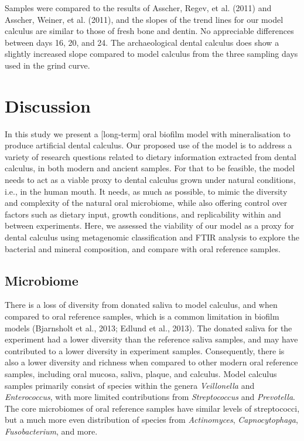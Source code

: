 \documentclass[
]{article}
\begin{document}
Samples were compared to the results of Asscher, Regev, et al. (2011)
and Asscher, Weiner, et al. (2011), and the slopes of the trend lines
for our model calculus are similar to those of fresh bone and dentin. No
appreciable differences between days 16, 20, and 24. The archaeological
dental calculus does show a slightly increased slope compared to model
calculus from the three sampling days used in the grind curve.

\hypertarget{discussion}{%
\section{Discussion}\label{discussion}}

In this study we present a {[}long-term{]} oral biofilm model with
mineralisation to produce artificial dental calculus. Our proposed use
of the model is to address a variety of research questions related to
dietary information extracted from dental calculus, in both modern and
ancient samples. For that to be feasible, the model needs to act as a
viable proxy to dental calculus grown under natural conditions, i.e., in
the human mouth. It needs, as much as possible, to mimic the diversity
and complexity of the natural oral microbiome, while also offering
control over factors such as dietary input, growth conditions, and
replicability within and between experiments. Here, we assessed the
viability of our model as a proxy for dental calculus using metagenomic
classification and FTIR analysis to explore the bacterial and mineral
composition, and compare with oral reference samples.

\hypertarget{microbiome}{%
\subsection{Microbiome}\label{microbiome}}

There is a loss of diversity from donated saliva to model calculus, and
when compared to oral reference samples, which is a common limitation in
biofilm models (Bjarnsholt et al., 2013; Edlund et al., 2013). The
donated saliva for the experiment had a lower diversity than the
reference saliva samples, and may have contributed to a lower diversity
in experiment samples. Consequently, there is also a lower diversity and
richness when compared to other modern oral reference samples, including
oral mucosa, saliva, plaque, and calculus. Model calculus samples
primarily consist of species within the genera \emph{Veillonella} and
\emph{Enterococcus}, with more limited contributions from
\emph{Streptococcus} and \emph{Prevotella}. The core microbiomes of oral
reference samples have similar levels of streptococci, but a much more
even distribution of species from \emph{Actinomyces},
\emph{Capnocytophaga}, \emph{Fusobacterium}, and more.
\end{document}
